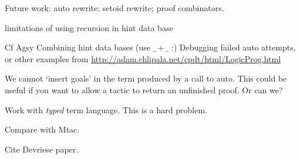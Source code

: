 \documentclass[preprint]{sigplanconf}
\begin{document}

Future work: auto rewrite; setoid rewrite; proof combinators.

limitations of using recursion in hint data base

Cf Agsy
Combining hint data bases (use $\_\plus\_$ :)
Debugging failed auto attempts, or other examples from
\url{http://adam.chlipala.net/cpdt/html/LogicProg.html}

We cannot `insert goals' in the term produced by a call to auto. This
could be useful if you want to allow a tactic to return an unfinished
proof. Or can we? 

Work with \emph{typed} term language. This is a hard problem.

Compare with Mtac.

Cite Devriese paper.



\end{document}
